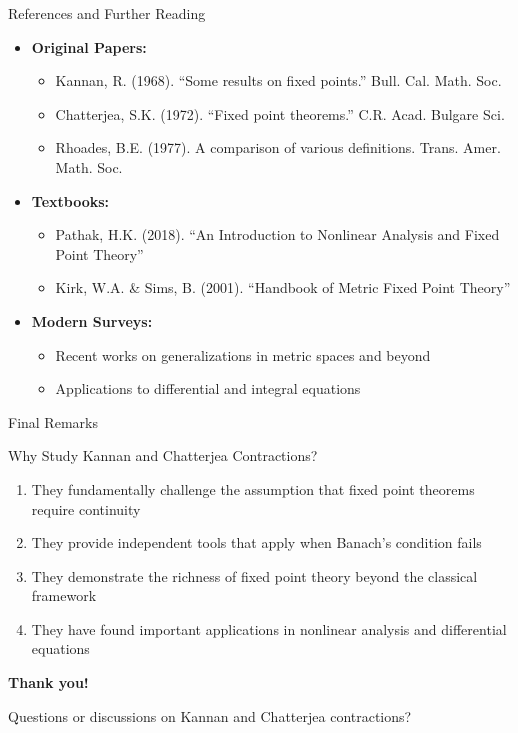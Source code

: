 \documentclass[aspectratio=169,10pt]{beamer}
\begin{document}
\begin{frame}{References and Further Reading}
    \begin{itemize}
        \item \textbf{Original Papers:}
        \begin{itemize}
            \item Kannan, R. (1968). ``Some results on fixed points.'' Bull. Cal. Math. Soc.
            \item Chatterjea, S.K. (1972). ``Fixed point theorems.'' C.R. Acad. Bulgare Sci.
            \item Rhoades, B.E. (1977). A comparison of various definitions. Trans. Amer. Math. Soc.
        \end{itemize}

        \item \textbf{Textbooks:}
        \begin{itemize}
            \item Pathak, H.K. (2018). ``An Introduction to Nonlinear Analysis and Fixed Point Theory''
            \item Kirk, W.A. \& Sims, B. (2001). ``Handbook of Metric Fixed Point Theory''
        \end{itemize}

        \item \textbf{Modern Surveys:}
        \begin{itemize}
            \item Recent works on generalizations in metric spaces and beyond
            \item Applications to differential and integral equations
        \end{itemize}
    \end{itemize}
\end{frame}

\begin{frame}{Final Remarks}
    \begin{block}{Why Study Kannan and Chatterjea Contractions?}
        \begin{enumerate}
            \item They fundamentally challenge the assumption that fixed point theorems require continuity
            \item They provide independent tools that apply when Banach's condition fails
            \item They demonstrate the richness of fixed point theory beyond the classical framework
            \item They have found important applications in nonlinear analysis and differential equations
        \end{enumerate}
    \end{block}

    \vspace{0.3cm}
    \begin{center}
        \textbf{\Large Thank you!}
        \vspace{0.2cm}

        Questions or discussions on Kannan and Chatterjea contractions?
    \end{center}
\end{frame}
\end{document}

